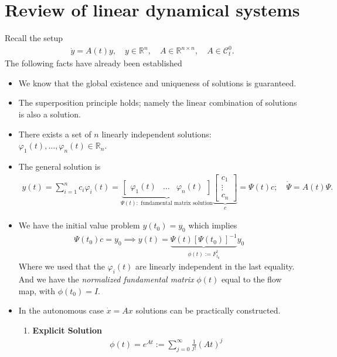 \section{Review of linear dynamical systems}
Recall the setup
\begin{align}
	\dot{{y} } = {A} (t){y}, \quad {y} \in \mathbb{R}^{n}, \quad {A} \in \mathbb{R}^{n \times n}, \quad {A} \in \mathcal{C}^{0}_{t}.
\end{align}
The following facts have already been established
\begin{itemize}
	\item We know that the global existence and uniqueness of solutions is guaranteed. 
	\item The superposition principle holds; namely the linear combination of solutions is also a solution.
	\item There exists a set of $n$ linearly independent solutions: $\varphi_1(t), \ldots, \varphi_n(t) \in \mathbb{R}_{n}$.
	\item The general solution is
		\begin{align}
			y(t) = \sum_{i=1}^{n} c_i \varphi_i(t) =
			\underbrace{\begin{bmatrix}
				\varphi_1(t) & \ldots & \varphi_n(t)
		\end{bmatrix}}_{\Psi(t):  \textrm{ fundamental matrix solution} }
		\underbrace{\begin{bmatrix}
			c_1 \\ \vdots \\ c_n
	\end{bmatrix}}_{c}
	= \Psi(t) {c}; \quad \dot{\Psi} = A(t) \Psi.			
		\end{align}
	\item We have the initial value problem ${y} (t_0) = {y} _0$ which implies
		\begin{align}
			\Psi(t_0) {c} = {y} _0 \implies {y} (t) = \underbrace{\Psi(t) \left[\Psi(t_0)\right]^{-1}}_{\phi(t):= F_{t_0}^{t}}{y} _0 
		\end{align}
		Where we used that the $\varphi_i(t)$ are linearly independent in the last equality. And we have the \emph{normalized fundamental matrix} $\phi(t)$ equal to the flow map, with $\phi(t_0)={I} $.
	\item In the autonomous case $\dot{{x} }= {A} {x} $ solutions can be practically constructed.
	\begin{enumerate} 
		\item \textbf{Explicit Solution} 
		\begin{align}
			\phi(t) = e^{{A} t} := \sum_{j=0}^{\infty } \frac{1}{j!} ({A} t)^{j}

\end{align}
\end{enumerate}
\end{itemize}
